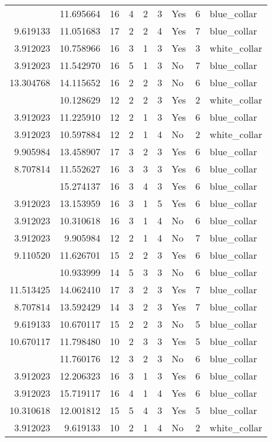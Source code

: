 \documentclass[
]{article}
\begin{document}
\begin{longtable}[t]{rrrrrllrl}
\addlinespace
8.929303 & 11.695664 & 16 & 4 & 2 & 3 & Yes & 6 & blue\_collar\\
9.619133 & 11.051683 & 17 & 2 & 2 & 4 & Yes & 7 & blue\_collar\\
3.912023 & 10.758966 & 16 & 3 & 1 & 3 & Yes & 3 & white\_collar\\
3.912023 & 11.542970 & 16 & 5 & 1 & 3 & No & 7 & blue\_collar\\
13.304768 & 14.115652 & 16 & 2 & 2 & 3 & No & 6 & blue\_collar\\
\addlinespace
6.956545 & 10.128629 & 12 & 2 & 2 & 3 & Yes & 2 & white\_collar\\
3.912023 & 11.225910 & 12 & 2 & 1 & 3 & Yes & 6 & blue\_collar\\
3.912023 & 10.597884 & 12 & 2 & 1 & 4 & No & 2 & white\_collar\\
9.905984 & 13.458907 & 17 & 3 & 2 & 3 & Yes & 6 & blue\_collar\\
8.707814 & 11.552627 & 16 & 3 & 3 & 3 & Yes & 6 & blue\_collar\\
\addlinespace
11.002933 & 15.274137 & 16 & 3 & 4 & 3 & Yes & 6 & blue\_collar\\
3.912023 & 13.153959 & 16 & 3 & 1 & 5 & Yes & 6 & blue\_collar\\
3.912023 & 10.310618 & 16 & 3 & 1 & 4 & No & 6 & blue\_collar\\
3.912023 & 9.905984 & 12 & 2 & 1 & 4 & No & 7 & blue\_collar\\
9.110520 & 11.626701 & 15 & 2 & 2 & 3 & Yes & 6 & blue\_collar\\
\addlinespace
8.444622 & 10.933999 & 14 & 5 & 3 & 3 & No & 6 & blue\_collar\\
11.513425 & 14.062410 & 17 & 3 & 2 & 3 & Yes & 7 & blue\_collar\\
8.707814 & 13.592429 & 14 & 3 & 2 & 3 & Yes & 7 & blue\_collar\\
9.619133 & 10.670117 & 15 & 2 & 2 & 3 & No & 5 & blue\_collar\\
10.670117 & 11.798480 & 10 & 2 & 3 & 3 & Yes & 5 & blue\_collar\\
\addlinespace
10.820778 & 11.760176 & 12 & 3 & 2 & 3 & No & 6 & blue\_collar\\
3.912023 & 12.206323 & 16 & 3 & 1 & 3 & Yes & 6 & blue\_collar\\
3.912023 & 15.719117 & 16 & 4 & 1 & 4 & Yes & 6 & blue\_collar\\
10.310618 & 12.001812 & 15 & 5 & 4 & 3 & Yes & 5 & blue\_collar\\
3.912023 & 9.619133 & 10 & 2 & 1 & 4 & No & 2 & white\_collar\\

\end{longtable}
\end{document}
